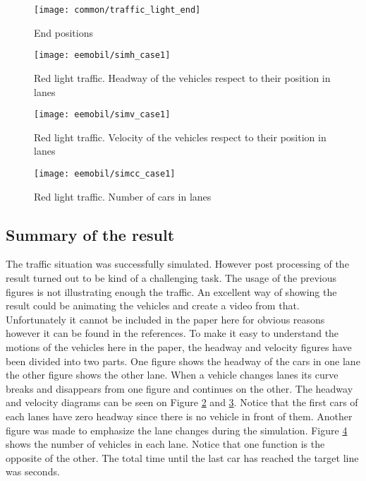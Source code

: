 		\begin{figure}
			\centering
			\texttt{[image: common/traffic\_light\_end]}
			\caption{End positions}
			\label{fig:traffic_light_end}
		\end{figure}
		\begin{figure}
			\centering
			\texttt{[image: eemobil/simh\_case1]}
			\caption{Red light traffic. Headway of the vehicles respect to their position in lanes}
			\label{fig:red_light_situationh}
		\end{figure}
		\begin{figure}
			\centering
			\texttt{[image: eemobil/simv\_case1]}
			\caption{Red light traffic. Velocity of the vehicles respect to their position in lanes}
			\label{fig:red_light_situationv}
		\end{figure}
		\begin{figure}
			\centering
			\texttt{[image: eemobil/simcc\_case1]}
			\caption{Red light traffic. Number of cars in lanes }
			\label{fig:red_light_situationcc}
		\end{figure}
		\subsection*{Summary of the result}
		The traffic situation was successfully simulated. However post processing of the result turned out to be kind of a challenging task. The usage of the previous figures is not illustrating enough the traffic. An excellent way of showing the result could be animating the vehicles and create a video from that. Unfortunately it cannot be included in the paper here for obvious reasons however it can be found in the references. To make it easy to understand the motions of the vehicles here in the paper, the headway and velocity figures have been divided into two parts. One figure shows the headway of the cars in one lane the other figure shows the other lane. When a vehicle changes lanes its curve breaks and disappears from one figure and continues on the other.
		The headway and velocity diagrams can be seen on Figure \ref{fig:red_light_situationh} and \ref{fig:red_light_situationv}. Notice that the first cars of each lanes have zero headway since there is no vehicle in front of them. Another figure was made to emphasize the lane changes during the simulation. Figure \ref{fig:red_light_situationcc} shows the number of vehicles in each lane. Notice that one function is the opposite of the other. The total time until the last car has reached the target line was seconds.
